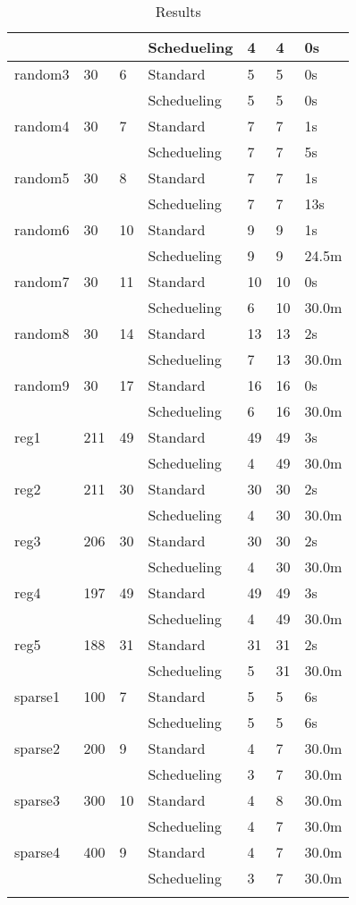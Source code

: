 \begin{longtable}{|lll|l|l|l|l|}
\cline{4-7}
&&&Schedueling&4  &4 &0s\\
\hline
random3&30&6&Standard&5&5&0s\\
\cline{4-7}
&&&Schedueling&5  &5 &0s\\
\hline
random4&30&7&Standard&7&7&1s\\
\cline{4-7}
&&&Schedueling&7  &7 &5s\\
\hline
random5&30&8&Standard&7&7&1s\\
\cline{4-7}
&&&Schedueling&7  &7 &13s\\
\hline
random6&30&10&Standard&9&9&1s\\
\cline{4-7}
&&&Schedueling&9  &9 &24.5m\\
\hline
random7&30&11&Standard&10&10&0s\\
\cline{4-7}
&&&Schedueling&6  &10 &30.0m\\
\hline
random8&30&14&Standard&13&13&2s\\
\cline{4-7}
&&&Schedueling&7  &13 &30.0m\\
\hline
random9&30&17&Standard&16&16&0s\\
\cline{4-7}
&&&Schedueling&6  &16 &30.0m\\
\hline
reg1&211&49&Standard&49&49&3s\\
\cline{4-7}
&&&Schedueling&4  &49 &30.0m\\
\hline
reg2&211&30&Standard&30&30&2s\\
\cline{4-7}
&&&Schedueling&4  &30 &30.0m\\
\hline
reg3&206&30&Standard&30&30&2s\\
\cline{4-7}
&&&Schedueling&4  &30 &30.0m\\
\hline
reg4&197&49&Standard&49&49&3s\\
\cline{4-7}
&&&Schedueling&4  &49 &30.0m\\
\hline
reg5&188&31&Standard&31&31&2s\\
\cline{4-7}
&&&Schedueling&5  &31 &30.0m\\
\hline
sparse1&100&7&Standard&5&5&6s\\
\cline{4-7}
&&&Schedueling&5  &5 &6s\\
\hline
sparse2&200&9&Standard&4&7&30.0m\\
\cline{4-7}
&&&Schedueling&3  &7 &30.0m\\
\hline
sparse3&300&10&Standard&4&8&30.0m\\
\cline{4-7}
&&&Schedueling&4  &7 &30.0m\\
\hline
sparse4&400&9&Standard&4&7&30.0m\\
\cline{4-7}
&&&Schedueling&3  &7 &30.0m\\
\bottomrule
\caption{Results}
\label{table}
\end{longtable}
